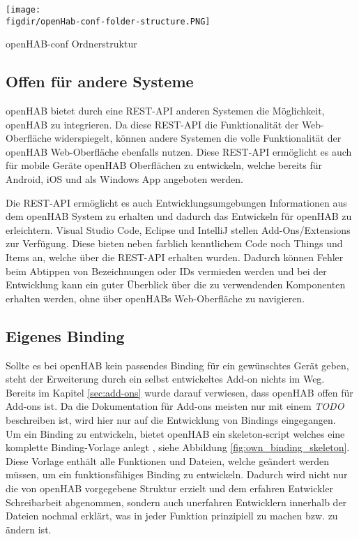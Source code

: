 {
	\centering
	\captionsetup{type=figure}
	\texttt{[image: \\figdir/openHab-conf-folder-structure.PNG]}
	\caption{openHAB-conf Ordnerstruktur \label{fig:openHab-conf-folder-structure}}
}

\subsection{Offen für andere Systeme}
openHAB bietet durch eine REST-API anderen Systemen die Möglichkeit, openHAB zu integrieren. Da diese REST-API die Funktionalität der Web-Oberfläche widerspiegelt, können andere Systemen die volle Funktionalität der openHAB Web-Oberfläche ebenfalls nutzen. Diese REST-API ermöglicht es auch für mobile Geräte openHAB Oberflächen zu entwickeln, welche bereits für Android, iOS und als Windows App angeboten werden.

Die REST-API ermöglicht es auch Entwicklungsumgebungen Informationen aus dem openHAB System zu erhalten und dadurch das Entwickeln für openHAB zu erleichtern. Visual Studio Code, Eclipse und IntelliJ stellen Add-Ons/Extensions zur Verfügung. Diese bieten neben farblich kenntlichem Code noch Things und Items an, welche über die REST-API erhalten wurden. Dadurch können Fehler beim Abtippen von Bezeichnungen oder IDs vermieden werden und bei der Entwicklung kann ein guter Überblick über die zu verwendenden Komponenten erhalten werden, ohne über openHABs Web-Oberfläche zu navigieren.

\subsection{Eigenes Binding}
Sollte es bei openHAB kein passendes Binding für ein gewünschtes Gerät geben, steht der Erweiterung durch ein selbst entwickeltes Add-on nichts im Weg. Bereits im Kapitel \ref{sec:add-ons} wurde darauf verwiesen, dass openHAB offen für Add-ons ist. Da die Dokumentation für Add-ons meisten nur mit einem \textit{TODO} beschreiben ist, wird hier nur auf die Entwicklung von Bindings eingegangen.\\
Um ein Binding zu entwickeln, bietet openHAB ein skeleton-script welches eine komplette Binding-Vorlage anlegt \cite{OPENHAB05:OH}, siehe Abbildung \ref{fig:own_binding_skeleton}. Diese Vorlage enthält alle Funktionen und Dateien, welche geändert werden müssen, um ein funktionsfähiges Binding zu entwickeln. Dadurch wird nicht nur die von openHAB vorgegebene Struktur erzielt und dem erfahren Entwickler Schreibarbeit abgenommen, sondern auch unerfahren Entwicklern innerhalb der Dateien nochmal erklärt, was in jeder Funktion prinzipiell zu machen bzw. zu ändern ist.

